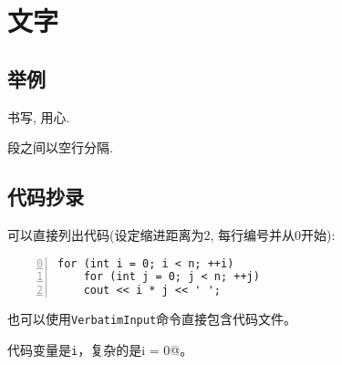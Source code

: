 \chapter{文字}

\section{举例}

  书写, 用心.

  段之间以空行分隔.

\newpage

\section{代码抄录}

可以直接列出代码(设定缩进距离为2, 每行编号并从0开始):
\begin{Verbatim}[tabsize=2,numbers=left,firstnumber=0]
for (int i = 0; i < n; ++i)
	for (int j = 0; j < n; ++j)
    cout << i * j << ' ';
\end{Verbatim}

	也可以使用\texttt{VerbatimInput}命令直接包含代码文件。

	代码变量是\texttt{i}，复杂的是\Verb@int i = 0@。
